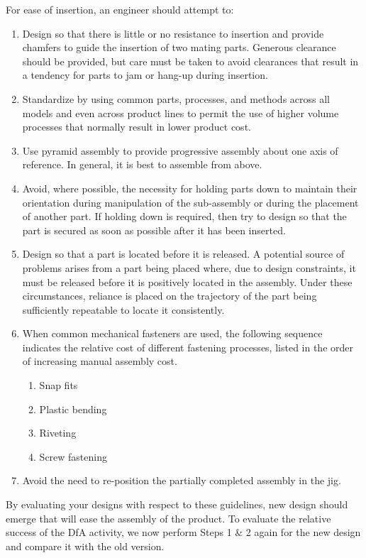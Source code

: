  For ease of insertion, an engineer should attempt to:

\begin{enumerate}
    \item Design so that there is little or no resistance to insertion and provide chamfers to guide the insertion of two mating parts. Generous clearance should be provided, but care must be taken to avoid clearances that result in a tendency for parts to jam or hang-up during insertion.
    \item Standardize by using common parts, processes, and methods across all models and even across product lines to permit the use of higher volume processes that normally result in lower product cost.
    \item Use pyramid assembly to provide progressive assembly about one axis of reference. In general, it is best to assemble from above.
    \item Avoid, where possible, the necessity for holding parts down to maintain their orientation during manipulation of the sub-assembly or during the placement of another part. If holding down is required, then try to design so that the part is secured as soon as possible after it has been inserted.
    \item Design so that a part is located before it is released. A potential source of problems arises from a part being placed where, due to design constraints, it must be released before it is positively located in the assembly. Under these circumstances, reliance is placed on the trajectory of the part being sufficiently repeatable to locate it consistently.
    \item When common mechanical fasteners are used, the following sequence indicates the relative cost of different fastening processes, listed in the order of increasing manual assembly cost.
    \begin{enumerate}
        \item Snap fits
        \item Plastic bending
        \item Riveting
        \item Screw fastening
    \end{enumerate}
    \item Avoid the need to re-position the partially completed assembly in the jig.
\end{enumerate}

By evaluating your designs with respect to these guidelines, new design should emerge that will ease the assembly of the product. To evaluate the relative success of the DfA activity, we now perform Steps 1 \& 2 again for the new design and compare it with the old version.


